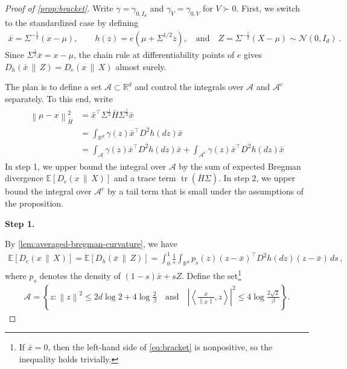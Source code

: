 \documentclass{article}
\newcommand{\proofstepinline}[1]{%
    {\normalfont\normalsize\bfseries\color{blue!55!black}Step #1.}\enspace
}
\newcommand{\R}{\mathbb R}
\newcommand{\E}{\mathbb E}
\newcommand{\N}{\mathcal N}
\newcommand{\tr}{\operatorname{tr}}
\newcommand{\1}{\mathbf 1}
\newcommand{\ip}[2]{\left\langle #1,#2\right\rangle}
\newcommand{\norm}[1]{\left\lVert #1\right\rVert}
\newcommand{\normm}[2]{\left\lVert #1\right\rVert_{#2}}
\begin{document}
\begin{proof}[Proof of \cref{prop:bracket}]
    Write $\gamma=\gamma_{0,I_d}$ and $\gamma_V=\gamma_{0,V}$ for $V\succ0$.
    First, we switch to the standardized case by defining
    \begin{align}
        \bar{x}=\Sigma^{-\frac12}(x-\mu),
        \qquad
        h(z)=e(\mu+\Sigma^{1/2}z),
        \quad\text{and}
        \quad
        Z=\Sigma^{-\frac12}(X - \mu) \sim \N(0,I_d)\,.
    \end{align}
    Since $\Sigma^{\frac12}\bar{x}=x-\mu$, the chain rule at
    differentiability points of $e$ gives
    $D_h(\bar{x}\,\|\,Z)=D_e(x\,\|\,X)$
    almost surely.

    The plan is to define a set $\mathcal A\subset \R^d$ and control the integrals over $\mathcal A$ and $\mathcal A^c$ separately.
    To this end, write
    \begin{align}
        \begin{aligned}
            \normm{\mu-x}{\bar{H}}^2
             & =
            \bar{x}^\top \Sigma^{\frac12}\bar{H}\Sigma^{\frac12}\bar{x}
            \\
             & =
            \int_{\R^d}\gamma(z)\bar{x}^\top D^2h(dz)\bar{x}
            \\
             & =
            \int_{\mathcal A}\gamma(z)\bar{x}^\top D^2h(dz)\bar{x}
            +
            \int_{\mathcal A^c}\gamma(z)\bar{x}^\top D^2h(dz)\bar{x}
        \end{aligned}
        \label{eq:standardized-comparator-curvature}
    \end{align}
    In step 1, we upper bound the integral over $\mathcal A$ by the sum of expected Bregman divergence $\E[D_e(x\,\|\,X)]$ and a trace term $\tr(\bar{H}\Sigma)$.
    In step 2, we upper bound the integral over $\mathcal A^c$ by a tail term that is small under the assumptions of the proposition.

    \proofstepinline{1}
    By \cref{lem:averaged-bregman-curvature}, we have
    \begin{align}
        \E[D_e(x\,\|\,X)]
        =
        \E[D_h(\bar{x}\,\|\,Z)]
        =
        \int_0^1\frac1s
        \int_{\R^d}
        p_s(z)(z-\bar{x})^\top D^2h(dz)(z-\bar{x})\,ds\,,
        \label{eq:bregman-density}
    \end{align}
    where $p_s$ denotes the density of $(1-s)\bar{x}+sZ$.
    Define the set\footnote{
        If $\bar{x}=0$, then the left-hand side of \eqref{eq:bracket} is nonpositive, so the inequality holds trivially.
    }
    \begin{align}
        \mathcal A=\left\{z:
        \norm{z}^2\leq2d\log2+4\log\frac2\beta
        \quad
        \text{and}
        \quad
        \left|\ip{\frac{\bar{x}}{\norm{\bar{x}}}}{z}\right|^2
        \leq4\log\frac{2\sqrt2}{\beta}
        \right\}.
        \label{eq:A}
    \end{align}


\end{proof}
\end{document}
